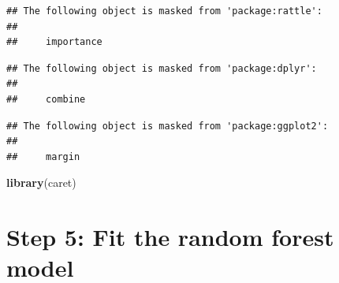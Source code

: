 \documentclass[
]{article}
\newenvironment{Shaded}{\begin{snugshade}}{\end{snugshade}}
\newcommand{\AttributeTok}[1]{\textcolor[rgb]{0.13,0.29,0.53}{#1}}
\newcommand{\CommentTok}[1]{\textcolor[rgb]{0.56,0.35,0.01}{\textit{#1}}}
\newcommand{\ConstantTok}[1]{\textcolor[rgb]{0.56,0.35,0.01}{#1}}
\newcommand{\DecValTok}[1]{\textcolor[rgb]{0.00,0.00,0.81}{#1}}
\newcommand{\FunctionTok}[1]{\textcolor[rgb]{0.13,0.29,0.53}{\textbf{#1}}}
\newcommand{\NormalTok}[1]{#1}
\newcommand{\OtherTok}[1]{\textcolor[rgb]{0.56,0.35,0.01}{#1}}
\newcommand{\SpecialCharTok}[1]{\textcolor[rgb]{0.81,0.36,0.00}{\textbf{#1}}}
\newcommand{\StringTok}[1]{\textcolor[rgb]{0.31,0.60,0.02}{#1}}
\begin{document}
\begin{verbatim}
## The following object is masked from 'package:rattle':
## 
##     importance
\end{verbatim}

\begin{verbatim}
## The following object is masked from 'package:dplyr':
## 
##     combine
\end{verbatim}

\begin{verbatim}
## The following object is masked from 'package:ggplot2':
## 
##     margin
\end{verbatim}

\begin{Shaded}
\begin{Highlighting}[]
\FunctionTok{library}\NormalTok{(caret)}
\end{Highlighting}
\end{Shaded}

\section{Step 5: Fit the random forest
model}\label{step-5-fit-the-random-forest-model}

\begin{Shaded}
\end{Shaded}
\end{document}
